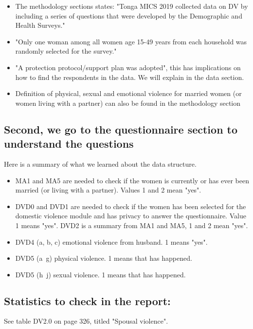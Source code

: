 \documentclass[12pt]{article}
\begin{document}
\begin{itemize}
	\item The methodology sections states: "Tonga MICS 2019 collected data on DV by including a series of questions that were developed by the Demographic
	and Health Surveys."
	\item "Only one woman among all women age 15-49 years from each household was randomly selected for the survey."
	\item "A protection protocol/support plan was adopted", this has implications on how to find the respondents in the data. We will explain in the data section.
	\item Definition of physical, sexual and emotional violence for married women (or women living with a partner) can also be found in the methodology section
	
\end{itemize}

\subsection{Second, we go to the questionnaire section to understand the questions}

Here is a summary of what we learned about the data structure.

\begin{itemize}
	\item MA1 and MA5 are needed to check if the women is currently or has ever been married (or living with a partner). Values 1 and 2 mean "yes".
	\item DVD0 and DVD1 are needed to check if the women has been selected for the domestic violence module and has privacy to answer the questionnaire. Value 1 means "yes". DVD2 is a summary from MA1 and MA5, 1 and 2 mean "yes".
	\item DVD4 (a, b, c) emotional violence from husband. 1 means "yes".
	\item DVD5 (a~g) physical violence. 1 means that has happened. 
	\item DVD5 (h~j) sexual violence. 1 means that has happened. 		
\end{itemize}

\subsection{Statistics to check in the report:}
See table DV2.0 on page 326, titled "Spousal violence". \\
\end{document}
